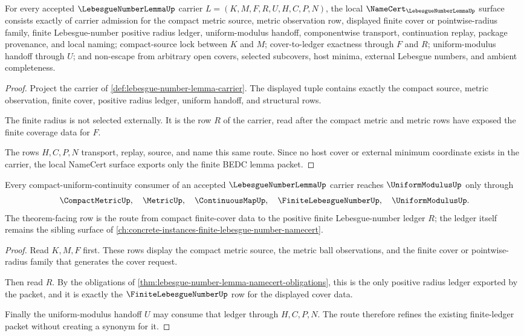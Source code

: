 \begin{theorem}
\label{thm:lebesgue-number-lemma-namecert-obligations}
For every accepted $\LebesgueNumberLemmaUp$ carrier $L=(K,M,F,R,U,H,C,P,N)$, the local $\NameCert_{\LebesgueNumberLemmaUp}$ surface consists exactly of carrier admission for the compact metric source, metric observation row, displayed finite cover or pointwise-radius family, finite Lebesgue-number positive radius ledger, uniform-modulus handoff, componentwise transport, continuation replay, package provenance, and local naming; compact-source lock between $K$ and $M$; cover-to-ledger exactness through $F$ and $R$; uniform-modulus handoff through $U$; and non-escape from arbitrary open covers, selected subcovers, host minima, external Lebesgue numbers, and ambient completeness.
\end{theorem}
\begin{proof}
Project the carrier of \autoref{def:lebesgue-number-lemma-carrier}. The displayed tuple contains exactly the compact source, metric observation, finite cover, positive radius ledger, uniform handoff, and structural rows.

The finite radius is not selected externally. It is the row $R$ of the carrier, read after the compact metric and metric rows have exposed the finite coverage data for $F$.

The rows $H,C,P,N$ transport, replay, source, and name this same route. Since no host cover or external minimum coordinate exists in the carrier, the local NameCert surface exports only the finite BEDC lemma packet.
\end{proof}

\begin{theorem}
\label{thm:lebesgue-number-lemma-uniform-modulus-handoff}
Every compact-uniform-continuity consumer of an accepted $\LebesgueNumberLemmaUp$ carrier reaches $\UniformModulusUp$ only through
$$
\CompactMetricUp,\quad \MetricUp,\quad \ContinuousMapUp,\quad \FiniteLebesgueNumberUp,\quad \UniformModulusUp .
$$
The theorem-facing row is the route from compact finite-cover data to the positive finite Lebesgue-number ledger $R$; the ledger itself remains the sibling surface of \autoref{ch:concrete-instances-finite-lebesgue-number-namecert}.
\end{theorem}
\begin{proof}
Read $K,M,F$ first. These rows display the compact metric source, the metric ball observations, and the finite cover or pointwise-radius family that generates the cover request.

Then read $R$. By the obligations of \autoref{thm:lebesgue-number-lemma-namecert-obligations}, this is the only positive radius ledger exported by the packet, and it is exactly the $\FiniteLebesgueNumberUp$ row for the displayed cover data.

Finally the uniform-modulus handoff $U$ may consume that ledger through $H,C,P,N$. The route therefore refines the existing finite-ledger packet without creating a synonym for it.
\end{proof}

